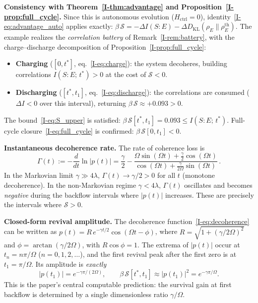 \documentclass[12pt,a4paper,openany]{book}
\begin{document}
\textbf{Consistency with
Theorem~\ref{I-thm:advantage} and
Proposition~\ref{I-prop:full_cycle}.}
Since this is autonomous evolution ($H_{\mathrm{ctrl}} = 0$),
identity~\eqref{I-eq:advantage_auto} applies exactly:
$\beta\,\mathcal{S} = -\Delta I(S{:}E)
- \Delta D_{\mathrm{KL}}(\rho_E \| \rho_E^{\mathrm{th}})$.
The example realizes the \emph{correlation battery}
of Remark~\ref{I-rem:battery}, with the charge--discharge
decomposition of
Proposition~\ref{I-prop:full_cycle}:
\begin{itemize}
\item \textbf{Charging} ($[0, t^*]$, eq.~\eqref{I-eq:charge}):
  the system decoheres, building correlations
  $I(S{:}E;\, t^*) > 0$ at the cost of
  $\mathcal{S} < 0$.
\item \textbf{Discharging} ($[t^*, t_1]$,
  eq.~\eqref{I-eq:discharge}):
  the correlations are consumed
  ($\Delta I < 0$ over this interval),
  returning $\beta\,\mathcal{S} \approx +0.093 > 0$.
\end{itemize}
The bound~\eqref{I-eq:S_upper} is satisfied:
$\beta\,\mathcal{S}[t^*, t_1] = 0.093
\leq I(S{:}E;\, t^*)$.
Full-cycle closure~\eqref{I-eq:full_cycle} is confirmed:
$\beta\,\mathcal{S}[0, t_1] < 0$.

\textbf{Instantaneous decoherence rate.}
The rate of coherence loss is
\begin{equation}
\label{I-eq:Gamma_inst}
\Gamma(t) := -\frac{d}{dt}\ln|p(t)|
= \frac{\gamma}{2}
  - \frac{\Omega\sin(\Omega t)
    + \tfrac{\gamma}{2}\cos(\Omega t)}
  {\cos(\Omega t)
    + \tfrac{\gamma}{2\Omega}\sin(\Omega t)}\,.
\end{equation}
In the Markovian limit $\gamma \gg 4\lambda$,
$\Gamma(t) \to \gamma/2 > 0$ for all $t$
(monotone decoherence).
In the non-Markovian regime $\gamma < 4\lambda$,
$\Gamma(t)$ oscillates and becomes \emph{negative}
during the backflow intervals where $|p(t)|$ increases.
These are precisely the intervals where
$\mathcal{S} > 0$.

\textbf{Closed-form revival amplitude.}
The decoherence function~\eqref{I-eq:decoherence} can be
written as $p(t) = R\, e^{-\gamma t/2}\cos(\Omega t - \phi)$,
where $R = \sqrt{1 + (\gamma/2\Omega)^2}$ and
$\phi = \arctan(\gamma/2\Omega)$, with $R\cos\phi = 1$.
The extrema of $|p(t)|$ occur at $t_n = n\pi/\Omega$
($n = 0, 1, 2, \ldots$), and the first revival peak
after the first zero is at $t_1 = \pi/\Omega$.
Its amplitude is \emph{exactly}
\begin{equation}
\label{I-eq:revival_exact}
|p(t_1)| = e^{-\gamma\pi/(2\Omega)},
\qquad
\beta\,\mathcal{S}[t^*, t_1]
\approx |p(t_1)|^2
= e^{-\gamma\pi/\Omega}.
\end{equation}
This is the paper's central computable prediction: the
survival gain at first backflow is determined by a single
dimensionless ratio $\gamma/\Omega$.
\end{document}
